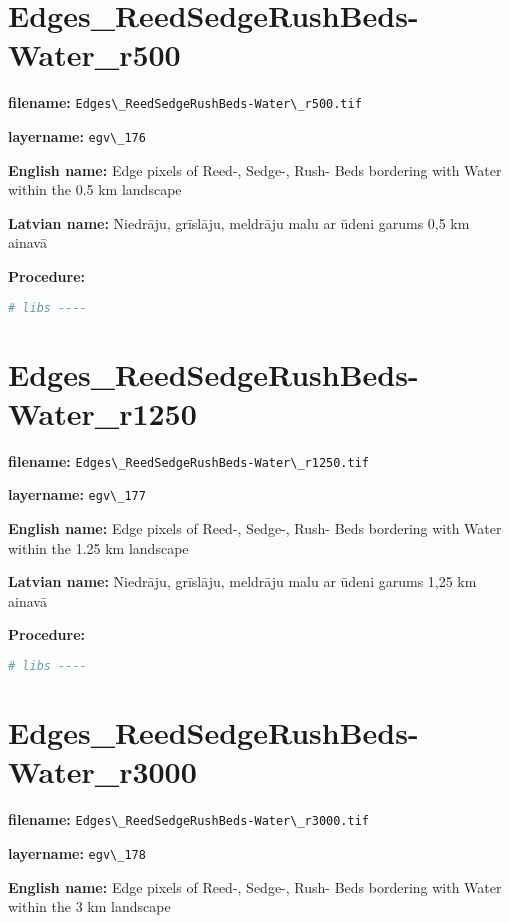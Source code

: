 \documentclass[
]{book}
\newcommand{\passthrough}[1]{#1}
\begin{document}
\section{Edges\_ReedSedgeRushBeds-Water\_r500}\label{ch06.176}

\textbf{filename:} \passthrough{\lstinline!Edges\_ReedSedgeRushBeds-Water\_r500.tif!}

\textbf{layername:} \passthrough{\lstinline!egv\_176!}

\textbf{English name:} Edge pixels of Reed-, Sedge-, Rush- Beds bordering with Water within the 0.5 km landscape

\textbf{Latvian name:} Niedrāju, grīslāju, meldrāju malu ar ūdeni garums 0,5 km ainavā

\textbf{Procedure:}

\begin{lstlisting}[language=R]
# libs ----
\end{lstlisting}

\section{Edges\_ReedSedgeRushBeds-Water\_r1250}\label{ch06.177}

\textbf{filename:} \passthrough{\lstinline!Edges\_ReedSedgeRushBeds-Water\_r1250.tif!}

\textbf{layername:} \passthrough{\lstinline!egv\_177!}

\textbf{English name:} Edge pixels of Reed-, Sedge-, Rush- Beds bordering with Water within the 1.25 km landscape

\textbf{Latvian name:} Niedrāju, grīslāju, meldrāju malu ar ūdeni garums 1,25 km ainavā

\textbf{Procedure:}

\begin{lstlisting}[language=R]
# libs ----
\end{lstlisting}

\section{Edges\_ReedSedgeRushBeds-Water\_r3000}\label{ch06.178}

\textbf{filename:} \passthrough{\lstinline!Edges\_ReedSedgeRushBeds-Water\_r3000.tif!}

\textbf{layername:} \passthrough{\lstinline!egv\_178!}

\textbf{English name:} Edge pixels of Reed-, Sedge-, Rush- Beds bordering with Water within the 3 km landscape
\end{document}
